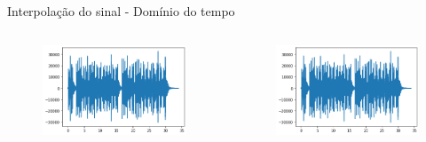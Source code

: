 \documentclass{beamer}
\begin{document}
\begin{frame}{Interpolação do sinal - Domínio do tempo}
   \begin{columns}
            \begin{figure}
                \centering
                \includegraphics[width = \columnwidth]{interpol_time.png}
            \end{figure}
            
        \begin{figure}
            \centering
            \includegraphics[width = \columnwidth]{interpol_tim2.png}
        \end{figure}
    \end{columns}
\end{frame}
\end{document}
